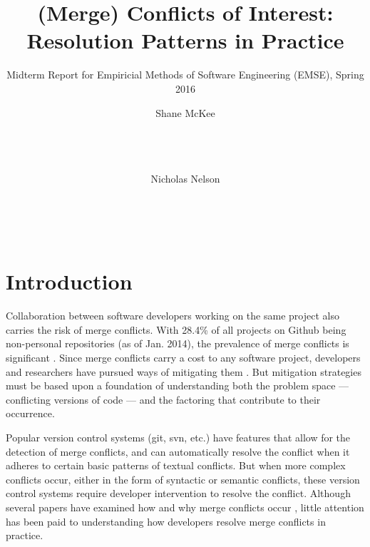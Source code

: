 \documentclass{sig-alternate-05-2015}
\begin{document}





\title{(Merge) Conflicts of Interest: Resolution Patterns in Practice}
\subtitle{Midterm Report for Empiricial Methods of Software Engineering (EMSE), Spring 2016}


\author{
\alignauthor
	Shane McKee\\
       	\\
       	\\
       	\\
\and
\alignauthor
Nicholas Nelson\\
       \\
       \\
       \\
}


\maketitle
\section{Introduction}\label{Introduction}
Collaboration between software developers working on the same project also carries the risk of merge conflicts. With 28.4\% of all projects on Github being non-personal repositories (as of Jan. 2014), the prevalence of merge conflicts is significant \cite{kalliamvakou14}. Since merge conflicts carry a cost to any software project, developers and researchers have pursued ways of mitigating them \cite{niu2012}. But mitigation strategies must be based upon a foundation of understanding both the problem space --- conflicting versions of code --- and the factoring that contribute to their occurrence.

Popular version control systems (git, svn, etc.) have features that allow for the detection of merge conflicts, and can automatically resolve the conflict when it adheres to certain basic patterns of textual conflicts. But when more complex conflicts occur, either in the form of syntactic or semantic conflicts, these version control systems require developer intervention to resolve the conflict. Although several papers have examined how and why merge conflicts occur \cite{brun10}\cite{Sarma08}\cite{Guimaraes12}, little attention has been paid to understanding how developers resolve merge conflicts in practice.
\end{document}
